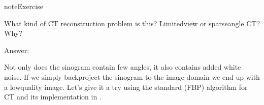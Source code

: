 \documentclass[letterpaper,10pt,english]{jupyterBook}
\begin{document}
\begin{sphinxadmonition}{note}{Exercise}

\sphinxAtStartPar
What kind of CT reconstruction problem is this? Limited\sphinxhyphen{}view or sparse\sphinxhyphen{}angle CT? Why?
\end{sphinxadmonition}

\sphinxAtStartPar
Answer:

\sphinxAtStartPar
Not only does the sinogram contain few angles, it also contains added white noise. If we simply backproject the sinogram to the image domain we end up with a low\sphinxhyphen{}quality image. Let’s give it a try using the standard  (FBP) algorithm for CT and its implementation in .
\end{document}
